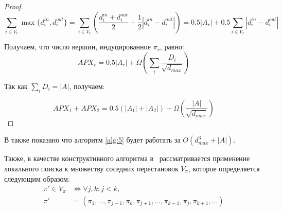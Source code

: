 \begin{proof}
    \[
        \sum\limits_{i \in V_r}\max\{d_i^{in}, d_i^{out}\} = 
        \sum\limits_{i \in V_r}\left(\dfrac{d_i^{in} + d_i^{out}}{2} + 
        \dfrac{1}{2} |d_i^{in} - d_i^{out}|\right) = 
        0.5|A_r| + 0.5\sum\limits_{i\in V_r}|d_i^{in} - d_i^{out}|
    \]

    Получаем, что число вершин, индуцированное $\pi_r$, равно:
    \[
        APX_r = 0.5|A_r| + \Omega\left(\sum\limits_i
        \dfrac{D_i}{\sqrt{d_{max}}}\right)
    \]

    Так как $\sum_iD_i = |A|$, получаем:

    \[
        APX_1 + APX_2 = 0.5(|A_1| + |A_2|) + \Omega(\dfrac{|A|}{\sqrt{d_{max}}})
    \]
\end{proof}

В \cite{rnd_alg} также показано что алгоритм \ref{alg:5} будет работать за 
$O(d_{max}^3 + |A|)$.

Также, в качестве конструктивного алгоритма в~\cite{rnd_alg} рассматривается 
применение локального поиска к множеству соседних перестановок $V_{\pi}$,
которое определяется следующим образом:
\begin{align*}
    \pi' \in V_{\pi} &\Leftrightarrow \forall j, k: j<k, \\
    \pi' &= (\pi_1, ..., \pi_{j-1}, \pi_k, \pi_{j+1}, ..., \pi_{k-1}, \pi_j,
    \pi_{k+1}, ...) \\
\end{align*}















